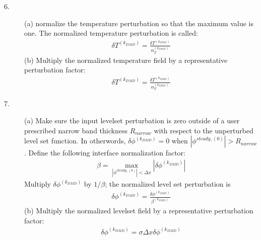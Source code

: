 \documentclass[]{article}
\begin{document}
\begin{description}
	\item[6.] (a) normalize the temperature perturbation 
		so that the maximum value is one.  The normalized temperature
		perturbation is called:
                \begin{eqnarray}
                \delta T^{(k_{DMD})}=
		\frac{\delta T^{(k_{DMD})}}
		{\alpha_{T}^{(k_{DMD})}}
                \end{eqnarray}
		(b) Multiply the normalized temperature field by a 
		representative perturbation factor:
                \begin{eqnarray}
                \delta T^{(k_{DMD})}=
		\frac{\delta T^{(k_{DMD})}}
		{\alpha_{T}^{(k_{DMD})}}
                \end{eqnarray}
	\item[7.] (a) Make sure the input levelset  perturbation is
		zero outside of a user prescribed narrow band thickness
		$R_{narrow}$ with respect to the unperturbed level set 
		function.  In otherwords, 
		$\delta\phi^{(k_{DMD})}=0$ when 
		$|\phi^{steady,(0)}|>R_{narrow}$.  Define the following
		interface normalization factor:
		\begin{eqnarray*}
			\beta=\max_{|\phi^{steady,(0)}|<\Delta x} 
			|\delta\phi^{(k_{DMD})}|
		\end{eqnarray*}
		Multiply $\delta\phi^{(k_{DMD})}$ by $1/\beta$; the 
		normalized
		level set perturbation is
                \begin{eqnarray}
		        \delta\phi^{(k_{DMD})}=
			\frac{\delta\phi^{(k_{DMD})}}
			{\beta^{(k_{DMD})}}
		\end{eqnarray}
		(b) Multiply the normalized levelset field by a 
		representative perturbation factor:
                \begin{eqnarray}
		        \delta\phi^{(k_{DMD})}=
			\sigma\Delta x \delta\phi^{(k_{DMD})}
		\end{eqnarray}


\end{description}
\end{document}
